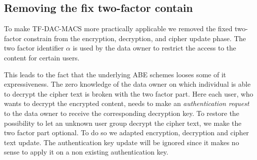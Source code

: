 \subsection{Removing the fix two-factor contain}
To make \ac{TF-DAC-MACS} more practically applicable we removed the fixed two-factor constrain from the encryption, decryption, and cipher update phase. The two factor identifier $\alpha$ is used by the data owner to restrict the access to the content for certain users. 

This leads to the fact that the underlying \ac{ABE} schemes looses some of it expressiveness. The zero knowledge of the data owner on which individual is able to decrypt the cipher text is broken with the two factor part. Here each user, who wants to decrypt the encrypted content, needs to make an \textit{authentication request} to the data owner to receive the corresponding decryption key. To restore the possibility to let an unknown user group decrypt the cipher text, we make the two factor part optional. To do so we adapted encryption, decryption and cipher text update. The authentication key update will be ignored since it makes no sense to apply it on a non existing authentication key. 


